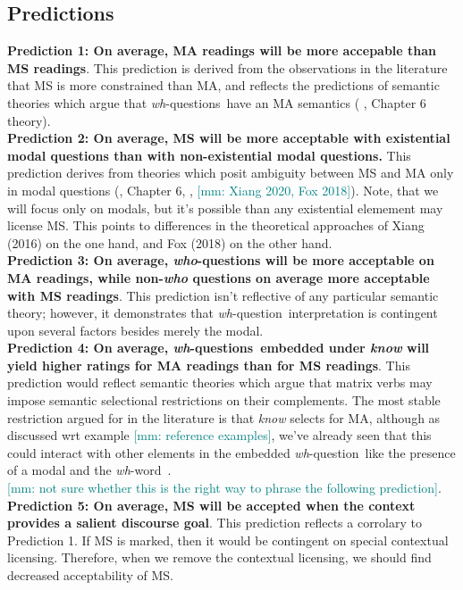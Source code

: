 \documentclass[12pt,letterpaper,table,svgnames,dvipsnames]{article}
\newcommand{\mm}[1]{\textcolor{teal}{[mm: #1]}}
\newcommand{\whq}{\emph{wh}-question~}
\newcommand{\whqs}{\emph{wh}-questions~}
\newcommand{\whw}{\emph{wh}-word~}
\begin{document}
\subsection{Predictions}

\textbf{Prediction 1: On average, MA readings will be more accepable than MS readings}. This prediction is derived from the observations in the literature that MS is more constrained than MA, and reflects the predictions of semantic theories which argue that \whqs have an MA semantics (\cite{groenstok1982,groenstok1984,karttunen1977,dayal2016} \cite{george2011}, Chapter 6 theory). \\

\noindent \textbf{Prediction 2: On average, MS will be more acceptable with existential modal questions than with non-existential modal questions.} This prediction derives from theories which posit ambiguity between MS and MA only in modal questions (\cite{george2011}, Chapter 6, \cite{fox2014,nicolae2014,xiang2016}, \mm{Xiang 2020, Fox 2018}). Note, that we will focus only on modals, but it's possible than any existential elemement may license MS. This points to differences in the theoretical approaches of Xiang (2016) on the one hand, and Fox (2018) on the other hand. \\

\noindent \textbf{Prediction 3: On average, \emph{who}-questions will be more acceptable on MA readings, while non-\emph{who} questions on average more acceptable with MS readings}. This prediction isn't reflective of any particular semantic theory; however, it demonstrates that \whq interpretation is contingent upon several factors besides merely the modal. \\

\noindent \textbf{Prediction 4: On average, \whqs embedded under \emph{know} will yield higher ratings for MA readings than for MS readings}. This prediction would reflect semantic theories which argue that matrix verbs may impose semantic selectional restrictions on their complements. The most stable restriction argued for in the literature is that \emph{know} selects for MA, although as discussed wrt example \mm{reference examples}, we've already seen that this could interact with other elements in the embedded \whq like the presence of a modal and the \whw.\\

\mm{not sure whether this is the right way to phrase the following prediction}.\\
\noindent \textbf{Prediction 5: On average, MS will be accepted when the context provides a salient discourse goal}. This prediction reflects a corrolary to Prediction 1. If MS is marked, then it would be contingent on special contextual licensing. Therefore, when we remove the contextual licensing, we should find decreased acceptability of MS. 
\end{document}
